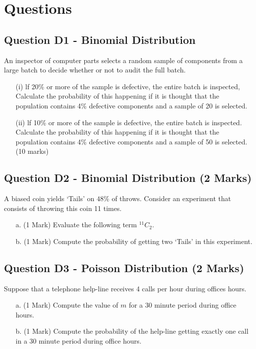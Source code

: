 ﻿







\chapter{Questions}
\section{Question D1 - Binomial Distribution } %
An inspector of computer parts selects a random sample of components
from a large batch to decide whether or not to audit the full batch.

\begin{itemize}
\item[(i)] lf 20\% or more of the sample is defective, the entire batch is
inspected, Calculate the probability of this happening if it is
thought that the population contains 4\% defective components and
a sample of 20 is selected.
\item[(ii)] lf 10\% or more of the sample is defective, the entire batch is
inspected. Calculate the probability of this happening if it is
thought that the population contains 4\% defective components and
a sample of 50 is selected.
(10 marks)
\end{itemize}


\section{Question D2 - Binomial Distribution (2 Marks) } %
A biased coin yields `Tails' on $48\%$ of throws. Consider an experiment that consists of throwing this coin 11 times.
\begin{itemize}
\item[a.] (1 Mark) Evaluate the following term $^{11}C_2$.
\item[b.] (1 Mark) Compute the probability of getting two `Tails' in this experiment.
\end{itemize}
\section{Question D3 -  Poisson Distribution (2 Marks) }  %
Suppose that a telephone help-line receives 4 calls per hour during offices hours.
\begin{itemize}
\item[a.] (1 Mark) Compute the value of $m$ for a 30 minute period during office hours.
\item[b.] (1 Mark) Compute the probability of the help-line getting exactly one call in a 30 minute period during office hours.
\end{itemize}

